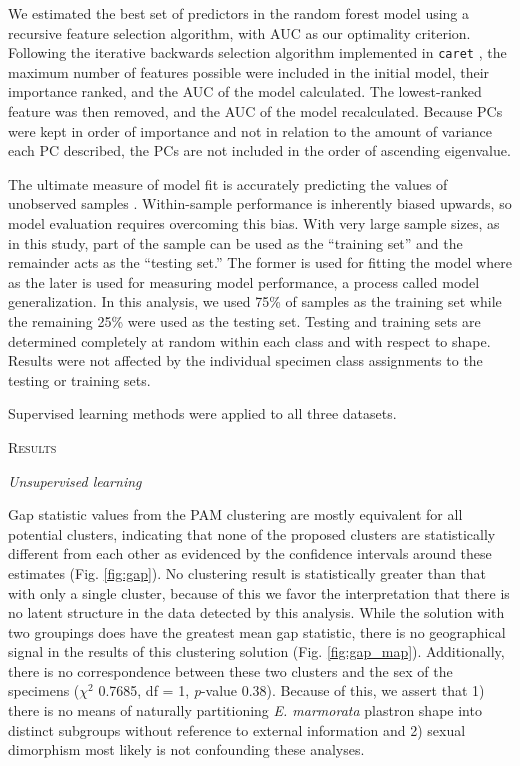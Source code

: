 \documentclass[12pt,letterpaper]{article}
\renewcommand{\section}[1]{%
\bigskip
\begin{center}
\begin{Large}
\normalfont\scshape #1
\medskip
\end{Large}
\end{center}}
\renewcommand{\subsection}[1]{%
\bigskip
\begin{center}
\begin{large}
\normalfont\itshape #1
\end{large}
\end{center}}
\begin{document}
We estimated the best set of predictors in the random forest model using a recursive feature selection algorithm, with AUC as our optimality criterion. Following the iterative backwards selection algorithm implemented in \texttt{caret} \citep{KuhnMAN2013}, the maximum number of features possible were included in the initial model, their importance ranked, and the AUC of the model calculated. The lowest-ranked feature was then removed, and the AUC of the model recalculated. Because PCs were kept in order of importance and not in relation to the amount of variance each PC described, the PCs are not included in the order of ascending eigenvalue.

The ultimate measure of model fit is accurately predicting the values of unobserved samples \citep{Hastie2009,Kuhn2013}. Within-sample performance is inherently biased upwards, so model evaluation requires overcoming this bias. With very large sample sizes, as in this study, part of the sample can be used as the ``training set'' and the remainder acts as the ``testing set.'' The former is used for fitting the model where as the later is used for measuring model performance, a process called model generalization. In this analysis, we used 75\% of samples as the training set while the remaining 25\% were used as the testing set. Testing and training sets are determined completely at random within each class and with respect to shape. Results were not affected by the individual specimen class assignments to the testing or training sets.

Supervised learning methods were applied to all three datasets.


\section{Results}

\subsection{Unsupervised learning}

Gap statistic values from the PAM clustering are mostly equivalent for all potential clusters, indicating that none of the proposed clusters are statistically different from each other as evidenced by the confidence intervals around these estimates (Fig. \ref{fig:gap}). No clustering result is statistically greater than that with only a single cluster, because of this we favor the interpretation that there is no latent structure in the data detected by this analysis. While the solution with two groupings does have the greatest mean gap statistic, there is no geographical signal in the results of this clustering solution (Fig. \ref{fig:gap_map}). Additionally, there is no correspondence between these two clusters and the sex of the specimens (\(\chi^{2}\) 0.7685, df = 1, \textit{p}-value 0.38). Because of this, we assert that 1) there is no means of naturally partitioning \textit{E. marmorata} plastron shape into distinct subgroups without reference to external information and 2) sexual dimorphism most likely is not confounding these analyses.
\end{document}
